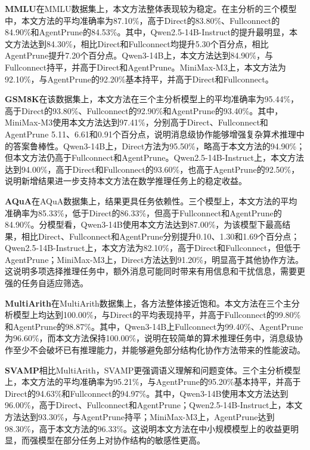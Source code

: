 \noindent\textbf{MMLU}在MMLU数据集上，本文方法整体表现较为稳定。在主分析的三个模型中，本文方法的平均准确率为87.10\%，高于Direct的83.80\%、Fullconnect的84.90\%和AgentPrune的84.53\%。其中，Qwen2.5-14B-Instruct的提升最明显，本文方法达到84.30\%，相比Direct和Fullconnect均提升5.30个百分点，相比AgentPrune提升7.20个百分点。Qwen3-14B上，本文方法达到84.90\%，与Fullconnect持平，并高于Direct和AgentPrune。MiniMax-M3上，本文方法为92.10\%，与AgentPrune的92.20\%基本持平，并高于Direct和Fullconnect。

\noindent\textbf{GSM8K}在该数据集上，本文方法在三个主分析模型上的平均准确率为95.44\%，高于Direct的93.80\%、Fullconnect的92.90\%和AgentPrune的93.40\%。其中，MiniMax-M3使用本文方法达到97.41\%，分别高于Direct、Fullconnect和AgentPrune 5.11、6.61和0.91个百分点，说明消息级协作能够增强复杂算术推理中的答案鲁棒性。Qwen3-14B上，Direct方法为95.50\%，略高于本文方法的94.90\%；但本文方法仍高于Fullconnect和AgentPrune。Qwen2.5-14B-Instruct上，本文方法达到94.00\%，高于Direct和Fullconnect的93.60\%，也高于AgentPrune的92.50\%，说明新增结果进一步支持本文方法在数学推理任务上的稳定收益。

\noindent\textbf{AQuA}在AQuA数据集上，结果更具任务依赖性。三个模型上，本文方法的平均准确率为85.33\%，低于Direct的86.33\%，但高于Fullconnect和AgentPrune的84.90\%。分模型看，Qwen3-14B使用本文方法达到87.00\%，为该模型下最高结果，相比Direct、Fullconnect和AgentPrune分别提升0.10、1.30和1.69个百分点；Qwen2.5-14B-Instruct上，本文方法为82.10\%，高于Direct和Fullconnect，但低于AgentPrune；MiniMax-M3上，Direct方法达到91.20\%，明显高于其他协作方法。这说明多项选择推理任务中，额外消息可能同时带来有用信息和干扰信息，需要更强的任务自适应筛选。

\noindent\textbf{MultiArith}在MultiArith数据集上，各方法整体接近饱和。本文方法在三个主分析模型上均达到100.00\%，与Direct的平均表现持平，并高于Fullconnect的99.80\%和AgentPrune的98.87\%。其中，Qwen3-14B上Fullconnect为99.40\%、AgentPrune为96.60\%，而本文方法保持100.00\%，说明在较简单的算术推理任务中，消息级协作至少不会破坏已有推理能力，并能够避免部分结构化协作方法带来的性能波动。

\noindent\textbf{SVAMP}相比MultiArith，SVAMP更强调语义理解和问题变体。三个主分析模型上，本文方法的平均准确率为95.21\%，与AgentPrune的95.20\%基本持平，并高于Direct的94.63\%和Fullconnect的94.97\%。其中，Qwen3-14B使用本文方法达到96.00\%，高于Direct、Fullconnect和AgentPrune；Qwen2.5-14B-Instruct上，本文方法达到93.30\%，与AgentPrune持平；MiniMax-M3上，AgentPrune达到98.30\%，高于本文方法的96.33\%。这说明本文方法在中小规模模型上的收益更明显，而强模型在部分任务上对协作结构的敏感性更高。

